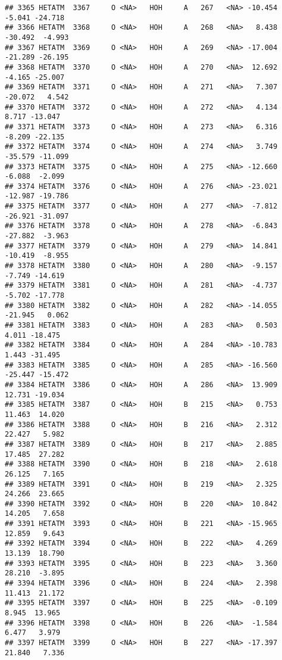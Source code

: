 \documentclass[
]{article}
\begin{document}
\begin{verbatim}
## 3365 HETATM  3367     O <NA>   HOH     A   267   <NA> -10.454  -5.041 -24.718
## 3366 HETATM  3368     O <NA>   HOH     A   268   <NA>   8.438 -30.492  -4.993
## 3367 HETATM  3369     O <NA>   HOH     A   269   <NA> -17.004 -21.289 -26.195
## 3368 HETATM  3370     O <NA>   HOH     A   270   <NA>  12.692  -4.165 -25.007
## 3369 HETATM  3371     O <NA>   HOH     A   271   <NA>   7.307 -20.072   4.542
## 3370 HETATM  3372     O <NA>   HOH     A   272   <NA>   4.134   8.717 -13.047
## 3371 HETATM  3373     O <NA>   HOH     A   273   <NA>   6.316  -8.209 -22.135
## 3372 HETATM  3374     O <NA>   HOH     A   274   <NA>   3.749 -35.579 -11.099
## 3373 HETATM  3375     O <NA>   HOH     A   275   <NA> -12.660  -6.088  -2.099
## 3374 HETATM  3376     O <NA>   HOH     A   276   <NA> -23.021 -12.987 -19.786
## 3375 HETATM  3377     O <NA>   HOH     A   277   <NA>  -7.812 -26.921 -31.097
## 3376 HETATM  3378     O <NA>   HOH     A   278   <NA>  -6.843 -27.882  -3.963
## 3377 HETATM  3379     O <NA>   HOH     A   279   <NA>  14.841 -10.419  -8.955
## 3378 HETATM  3380     O <NA>   HOH     A   280   <NA>  -9.157  -7.749 -14.619
## 3379 HETATM  3381     O <NA>   HOH     A   281   <NA>  -4.737  -5.702 -17.778
## 3380 HETATM  3382     O <NA>   HOH     A   282   <NA> -14.055 -21.945   0.062
## 3381 HETATM  3383     O <NA>   HOH     A   283   <NA>   0.503   4.011 -18.475
## 3382 HETATM  3384     O <NA>   HOH     A   284   <NA> -10.783   1.443 -31.495
## 3383 HETATM  3385     O <NA>   HOH     A   285   <NA> -16.560 -25.447 -15.472
## 3384 HETATM  3386     O <NA>   HOH     A   286   <NA>  13.909  12.731 -19.034
## 3385 HETATM  3387     O <NA>   HOH     B   215   <NA>   0.753  11.463  14.020
## 3386 HETATM  3388     O <NA>   HOH     B   216   <NA>   2.312  22.427   5.982
## 3387 HETATM  3389     O <NA>   HOH     B   217   <NA>   2.885  17.485  27.282
## 3388 HETATM  3390     O <NA>   HOH     B   218   <NA>   2.618  26.125   7.165
## 3389 HETATM  3391     O <NA>   HOH     B   219   <NA>   2.325  24.266  23.665
## 3390 HETATM  3392     O <NA>   HOH     B   220   <NA>  10.842  14.205   7.658
## 3391 HETATM  3393     O <NA>   HOH     B   221   <NA> -15.965  12.859   9.643
## 3392 HETATM  3394     O <NA>   HOH     B   222   <NA>   4.269  13.139  18.790
## 3393 HETATM  3395     O <NA>   HOH     B   223   <NA>   3.360  28.210  -3.895
## 3394 HETATM  3396     O <NA>   HOH     B   224   <NA>   2.398  11.413  21.172
## 3395 HETATM  3397     O <NA>   HOH     B   225   <NA>  -0.109   8.945  13.965
## 3396 HETATM  3398     O <NA>   HOH     B   226   <NA>  -1.584   6.477   3.979
## 3397 HETATM  3399     O <NA>   HOH     B   227   <NA> -17.397  21.840   7.336

\end{verbatim}
\end{document}
